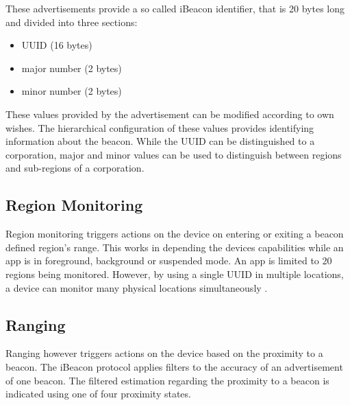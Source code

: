 These advertisements provide a so called iBeacon identifier, that is 20 bytes long and divided into three sections:

\begin{itemize}
    \item UUID (16 bytes)
    \item major number (2 bytes)
    \item minor number (2 bytes)
\end{itemize}

These values provided by the advertisement can be modified according to own wishes. The hierarchical configuration of these values provides identifying information about the beacon. While the UUID can be distinguished to a corporation, major and minor values can be used to distinguish between regions and sub-regions of a corporation.


\subsection{Region Monitoring}

Region monitoring triggers actions on the device on entering or exiting a beacon defined region's range. This works in depending the devices capabilities while an app is in foreground, background or suspended mode. An app is limited to 20 regions being monitored. However, by using a single UUID in multiple locations, a device can monitor many physical locations simultaneously \cite{iBeacon}.


\subsection{Ranging}

Ranging however triggers actions on the device based on the proximity to a beacon. The iBeacon protocol applies filters to the accuracy of an advertisement of one beacon. The filtered estimation regarding the proximity to a beacon is indicated using one of four proximity states.

